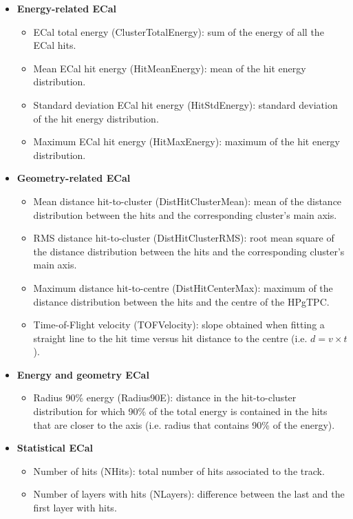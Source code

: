 \begin{itemize}
	\item \textbf{Energy-related ECal}
	\begin{itemize}
		\item ECal total energy (ClusterTotalEnergy): sum of the energy of all the ECal hits.
		\item Mean ECal hit energy (HitMeanEnergy): mean of the hit energy distribution.
		\item Standard deviation ECal hit energy (HitStdEnergy): standard deviation of the hit energy distribution.
		\item Maximum ECal hit energy (HitMaxEnergy): maximum of the hit energy distribution.
	\end{itemize}
	\item \textbf{Geometry-related ECal}
	\begin{itemize}
		\item Mean distance hit-to-cluster (DistHitClusterMean): mean of the distance distribution between the hits and the corresponding cluster's main axis.
		\item RMS distance hit-to-cluster (DistHitClusterRMS): root mean square of the distance distribution between the hits and the corresponding cluster's main axis.
		\item Maximum distance hit-to-centre (DistHitCenterMax): maximum of the distance distribution between the hits and the centre of the HPgTPC.
		\item Time-of-Flight velocity (TOFVelocity): slope obtained when fitting a straight line to the hit time versus hit distance to the centre (i.e. $d = v \times t$).
	\end{itemize}
	\item \textbf{Energy and geometry ECal}
	\begin{itemize}
		\item Radius 90\% energy (Radius90E): distance in the hit-to-cluster distribution for which 90\% of the total energy is contained in the hits that are closer to the axis (i.e. radius that contains 90\% of the energy).
	\end{itemize}
	\item \textbf{Statistical ECal}
	\begin{itemize}
		\item Number of hits (NHits): total number of hits associated to the track.
		\item Number of layers with hits (NLayers): difference between the last and the first layer with hits.
	\end{itemize}
\end{itemize}

